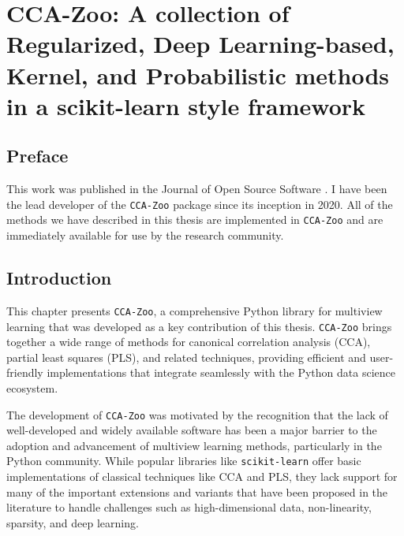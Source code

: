 \graphicspath{{chapters/software/}}


\chapter{CCA-Zoo: A collection of Regularized, Deep Learning-based, Kernel, and Probabilistic methods in a scikit-learn style framework}\label{ch:software}

\minitoc
\section*{Preface}

This work was published in the Journal of Open Source Software \citep{chapman2021cca}.
I have been the lead developer of the \texttt{CCA-Zoo} package since its inception in 2020.
All of the methods we have described in this thesis are implemented in \texttt{CCA-Zoo} and are immediately available for use by the research community.

\section{Introduction}

This chapter presents \texttt{CCA-Zoo}, a comprehensive Python library for multiview learning that was developed as a key contribution of this thesis. \texttt{CCA-Zoo} brings together a wide range of methods for canonical correlation analysis (CCA), partial least squares (PLS), and related techniques, providing efficient and user-friendly implementations that integrate seamlessly with the Python data science ecosystem.

The development of \texttt{CCA-Zoo} was motivated by the recognition that the lack of well-developed and widely available software has been a major barrier to the adoption and advancement of multiview learning methods, particularly in the Python community. While popular libraries like \texttt{scikit-learn} \citep{pedregosa2011scikit} offer basic implementations of classical techniques like CCA and PLS, they lack support for many of the important extensions and variants that have been proposed in the literature to handle challenges such as high-dimensional data, non-linearity, sparsity, and deep learning.

